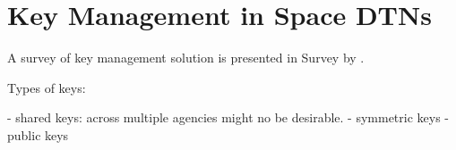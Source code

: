 \section{Key Management in Space DTNs}

A survey of key management solution is presented in Survey by \cite{menesidou2017cryptographic}. 



Types of keys:

- shared keys: across multiple agencies might no be desirable.
- symmetric keys
- public keys









